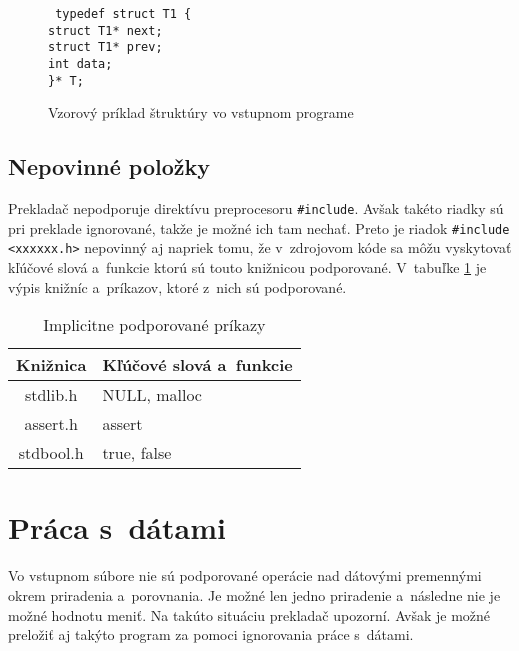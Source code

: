 \begin{center}
\begin{figure}
\texttt{
typedef struct T1 \{\\                                                            
\tab struct T1* next;\\                                                            
\tab struct T1* prev;\\                                                          
\tab int data;\\                                                                   
\}* T;
}

\label{fig:struct}
\caption{Vzorový príklad štruktúry vo vstupnom programe}
\end{figure}
\end{center}

\subsection{Nepovinné položky}
Prekladač nepodporuje direktívu preprocesoru \texttt{\#include}. Avšak takéto riadky sú pri preklade ignorované, takže je možné ich tam nechať. Preto je riadok \texttt{\#include <xxxxxx.h>} nepovinný aj napriek tomu, že v~zdrojovom kóde sa môžu vyskytovať kľúčové slová a~funkcie ktorú sú touto knižnicou podporované. V~tabuľke \ref{table:kniz} je výpis knižníc a~príkazov, ktoré z~nich sú podporované.

\begin{table}[]
\centering
\caption{Implicitne podporované príkazy}
\label{table:kniz}
\begin{tabular}{|c|l|}
\hline
\textbf{Knižnica} & \textbf{Kľúčové slová a~funkcie} \\ \hline
stdlib.h          & NULL, malloc                      \\ \hline
assert.h          & assert                            \\ \hline
stdbool.h         & true, false                       \\ \hline
\end{tabular}
\end{table}


\section{Práca s~dátami}
\label{sec_data}
Vo vstupnom súbore nie sú podporované operácie nad dátovými premennými okrem priradenia a~porovnania. Je možné len jedno priradenie a~následne nie je možné hodnotu meniť. Na takúto situáciu prekladač upozorní. Avšak je možné preložiť aj takýto program za pomoci ignorovania práce s~dátami.

